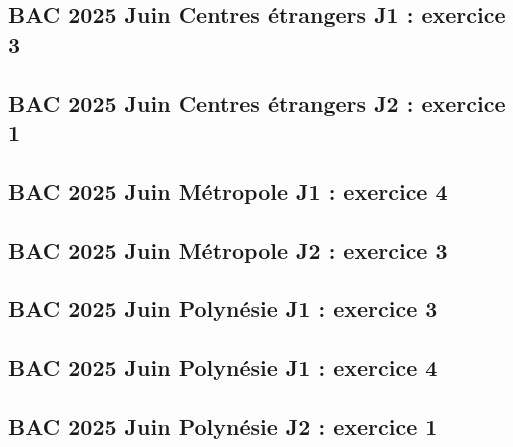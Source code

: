 \documentclass[lang=fr,edition=teacher,layout=sheet]{mxbook}
\begin{document}
\begingroup\endgroup
\par\bigskip
{}\subsection*{BAC 2025 Juin Centres étrangers J1 : exercice 3}
\begingroup\endgroup
\par\bigskip
{}\subsection*{BAC 2025 Juin Centres étrangers J2 : exercice 1}
\begingroup\endgroup
\par\bigskip
{}\subsection*{BAC 2025 Juin Métropole J1 : exercice 4}
\begingroup\endgroup
\par\bigskip
{}\subsection*{BAC 2025 Juin Métropole J2 : exercice 3}
\begingroup\endgroup
\par\bigskip
{}\subsection*{BAC 2025 Juin Polynésie J1 : exercice 3}
\begingroup\endgroup
\par\bigskip
{}\subsection*{BAC 2025 Juin Polynésie J1 : exercice 4}
\begingroup\endgroup
\par\bigskip
{}\subsection*{BAC 2025 Juin Polynésie J2 : exercice 1}
\end{document}
